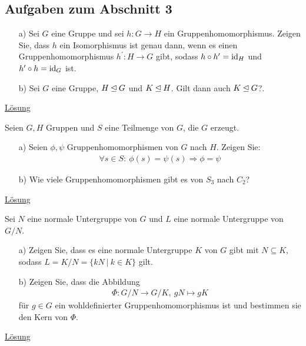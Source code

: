 \subsection{Aufgaben zum Abschnitt 3}

\begin{exe}\label{aufgabe:3.1} 
	\begin{enumerate}\
		\item[a)]
		Sei $ G $ eine Gruppe und sei $ h : G \to H $ ein Gruppenhomomorphismus.
		Zeigen Sie, dass $ h $ ein Isomorphismus ist genau dann, wenn
		es einen Gruppenhomomorphismus $ h^\prime: H \to G $ gibt,
		sodass $ h \circ h^\prime  = \operatorname{id}_H $ und $ h^\prime \circ h = \operatorname{id}_G $ ist.
		
		\item[b)] 
		Sei $ G $ eine Gruppe,
		$ H \unlhd G $ und $ K \unlhd H $.
		Gilt dann auch $ K \unlhd G $?.
	\end{enumerate}
	\hyperlink{loes:3.1}{Lösung}
\end{exe}

\begin{exe}\label{aufgabe:3.2}
	Seien $ G ,H$ Gruppen und $ S $ eine Teilmenge von $ G $, die $ G $ erzeugt.
	\begin{enumerate}
		\item[a)]
		Seien $ \phi,\psi $ Gruppenhomomorphismen von $ G $ nach $ H $.
		Zeigen Sie:
		\begin{align*}
		\forall s \in S: \ \phi(s) = \psi(s)
		\Rightarrow
		\phi = \psi
		\end{align*}  
		
		\item[b)]
		Wie viele Gruppenhomomorphismen gibt es von $ S_3 $ nach $ C_2 $? 
	\end{enumerate}
	\hyperlink{loes:3.2}{Lösung}
\end{exe}

\begin{exe}\label{aufgabe:3.3}
	Sei $ N $ eine normale Untergruppe von $ G $
	und $ L $ eine normale Untergruppe von $ G/N $.
	\begin{enumerate}
		\item[a)]
		Zeigen Sie,
		dass es eine normale Untergruppe $ K $ von $ G $ gibt
		mit $ N \subseteq K $, sodass
		$ L = K/N = \lbrace kN \ | \ k \in K \rbrace  $ gilt.
		
		\item[b)] 
		Zeigen Sie,
		dass die Abbildung
		\begin{align*}
		\Phi : G/N \to G/K, \ gN \mapsto gK
		\end{align*}
		für $ g \in G $ ein wohldefinierter Gruppenhomomorphismus ist
		und bestimmen sie den Kern von $ \Phi $.
	\end{enumerate}
	\hyperlink{loes:3.3}{Lösung}
\end{exe}